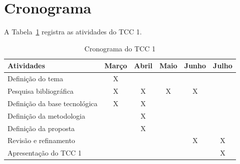 \section{Cronograma}

A Tabela~\ref{tab:cronograma-tcc1} registra as atividades do TCC 1.

\begin{table}[H]
\centering
\caption{Cronograma do TCC 1}
\label{tab:cronograma-tcc1}
\begin{tabular}{|l|c|c|c|c|c|}
\hline
\textbf{Atividades}                      & \textbf{Março} & \textbf{Abril} & \textbf{Maio} & \textbf{Junho} & \textbf{Julho} \\ \hline
Definição do tema                        & X                &                 &                   &                   &                   \\ \hline
Pesquisa bibliográfica                    & X                & X                 & X                 & X                 &                \\ \hline
Definição da base tecnológica             & X                & X                &                 &                   &                   \\ \hline
Definição da metodologia                  &                  & X                 &                   &                  &                   \\ \hline
Definição da proposta                     &                  & X                 &                   &                   &                   \\ \hline
Revisão e refinamento                     &                  &                   &                   & X                 & X                 \\ \hline
Apresentação do TCC 1                     &                  &                   &                   &                   & X                 \\ \hline
\end{tabular}
\end{table}
